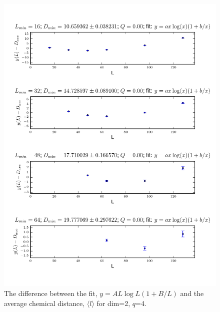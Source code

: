 \documentclass[pre,preprint]{revtex4}
\newcommand{\lb}{{\langle}}
\newcommand{\rb}{{\rangle}}
\begin{document}
\begin{figure}[htp]
\centering
\includegraphics[width=.85\textwidth]{figures/d_min_D2q4_46_log_fig}
\caption{The difference between the fit, $y=AL\log{L}(1+B/L)$ and the average chemical distance, $\lb l \rb$ for dim=2, $q$=4.}\label{fig:4}
\end{figure}

\end{document}
